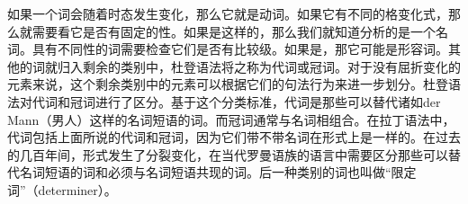 如果一个词会随着时态发生变化，那么它就是动词。如果它有不同的格变化式，那么就需要看它是否有固定的性。如果是这样的，那么我们就知道分析的是一个名词。具有不同性的词需要检查它们是否有比较级。如果是，那它可能是形容词。其他的词就归入剩余的类别中，杜登语法将之称为代词或冠词。对于没有屈折变化的元素来说，这个剩余类别中的元素可以根据它们的句法行为来进一步划分。杜登语法对代词和冠词进行了区分。基于这个分类标准，代词是那些可以替代诸如der
Mann（男人）这样的名词短语的词。而冠词通常与名词相组合。在拉丁语法中，代词包括上面所说的代词和冠词，因为它们带不带名词在形式上是一样的。在过去的几百年间，形式发生了分裂变化，在当代罗曼语族的语言中需要区分那些可以替代名词短语的词和必须与名词短语共现的词。后一种类别的词也叫做“限定词”（determiner）。

